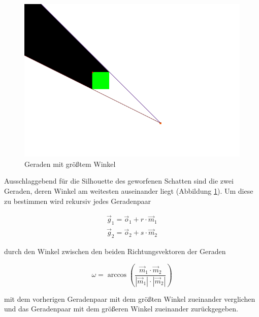 \begin{figure}[t]
	\centering
	\includegraphics[width=\columnwidth]{images/durchfuehrung_4.png}
	\caption{Geraden mit größtem Winkel}
	\label{fig:durch3}
\end{figure}

Ausschlaggebend für die Silhouette des geworfenen Schatten sind die zwei Geraden, deren Winkel am
weitesten auseinander liegt (Abbildung \ref{fig:durch3}). Um diese zu bestimmen wird rekursiv jedes
Geradenpaar

\begin{equation}
  \begin{split}
	\vec{g}_1 = \vec{o}_1 + r \cdot \vec{m}_1 \\
	\vec{g}_2 = \vec{o}_2 + s \cdot \vec{m}_2
  \end{split}
\end{equation}

durch den Winkel zwischen den beiden Richtungsvektoren der Geraden

\begin{equation}
	\omega = \arccos{\left(\frac{\vec{m}_1 \cdot \vec{m}_2}{|\vec{m}_1| \cdot |\vec{m}_2|} \right)}
\end{equation}

mit dem vorherigen Geradenpaar mit dem größten Winkel zueinander verglichen und das Geradenpaar mit
dem größeren Winkel zueinander zurückgegeben.

